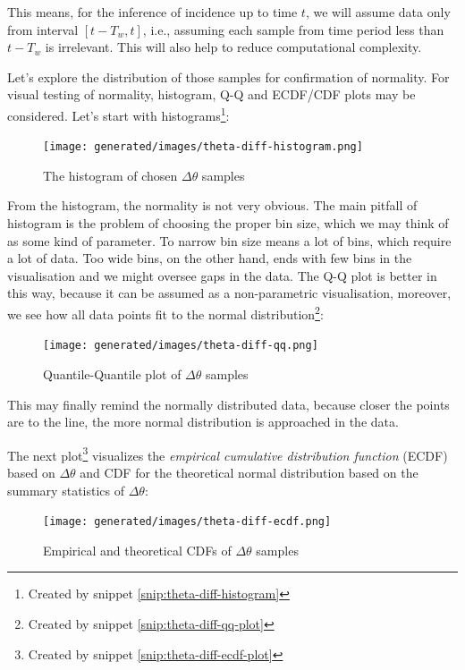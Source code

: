\documentclass[
  digital, %
  oneside, %
  lof,     %
  lot,     %
]{fithesis4}
\begin{document}
This means, for the inference of incidence up to time $t$, 
we will assume data only from interval $[t - T_w, t]$, i.e.,
assuming each sample from time period less than
$t - T_w$ is irrelevant.
This will also help to reduce computational complexity.

Let's explore the distribution of those samples 
for confirmation of normality. 
For visual testing of normality, histogram, 
Q-Q and ECDF/CDF plots may be considered. 
Let's start with histograms\footnote{Created by snippet \ref{snip:theta-diff-histogram}}:

\begin{figure}[H]
  \begin{center}
    \texttt{[image: generated/images/theta-diff-histogram.png]}
  \end{center}
  \caption{The histogram of chosen $\Delta \theta$ samples}
  \label{fig:theta-diff-histogram}
\end{figure}

From the histogram, the normality is not 
very obvious. 
The main pitfall of histogram is the problem 
of choosing the proper bin size, which we may 
think of as some kind of parameter. 
To narrow bin size means a lot of bins, which 
require a lot of data. 
Too wide bins, on the other hand, ends with 
few bins in the visualisation and we might 
oversee gaps in the data. 
The Q-Q plot is better in this way, because 
it can be assumed as a non-parametric 
visualisation, moreover, we see how all data 
points fit to the normal distribution\footnote{Created by snippet \ref{snip:theta-diff-qq-plot}}:

\begin{figure}[H]
  \begin{center}
    \texttt{[image: generated/images/theta-diff-qq.png]}
  \end{center}
  \caption{Quantile-Quantile plot of $\Delta \theta$ samples}
  \label{fig:theta-diff-qq}
\end{figure}


This may finally remind the normally distributed 
data, because closer the points are to the line, 
the more normal distribution is approached in 
the data.

The next plot\footnote{Created by snippet \ref{snip:theta-diff-ecdf-plot}} visualizes the 
\textit{empirical cumulative distribution function}
(ECDF) based on $\Delta \theta$ and CDF for the 
theoretical normal distribution based on 
the summary statistics of $\Delta \theta$:

\begin{figure}[H]
  \begin{center}
    \texttt{[image: generated/images/theta-diff-ecdf.png]}
  \end{center}
  \caption{Empirical and theoretical CDFs of $\Delta \theta$ samples}
  \label{fig:theta-diff-ecdf}
\end{figure}
\end{document}
